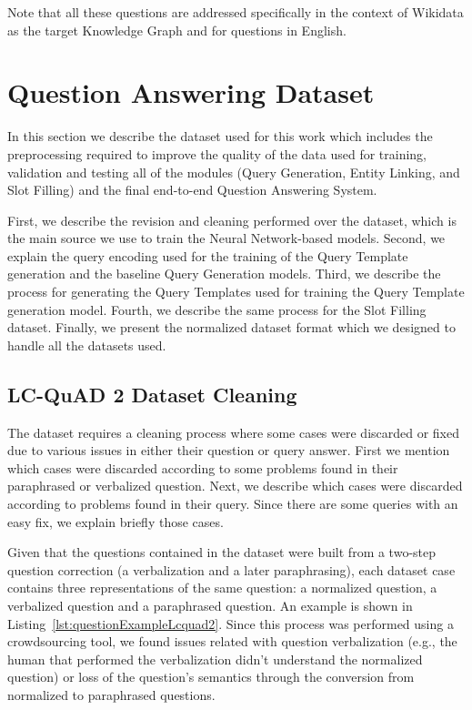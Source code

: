 Note that all these questions are addressed specifically in the context of Wikidata as 
the target Knowledge Graph and for questions in English.

\section{Question Answering Dataset}
\label{cap4:experimentalDesign/QaDataset}
In this section we describe the dataset used for this work which includes the preprocessing 
required to improve the quality of the data used for training, validation and testing all of 
the modules (Query Generation, Entity Linking, and Slot Filling) and the final end-to-end 
Question Answering System. 

First, we describe the revision and cleaning performed over the \LCQuADtwo{} dataset, which is the 
main source we use to train the Neural Network-based models. Second, we explain the \SPARQL{} query 
encoding used for the training of the Query Template generation and the baseline \SPARQL{} Query 
Generation models. Third, we describe the process for generating the Query Templates used for 
training the Query Template generation model. Fourth, we describe the same process for the Slot 
Filling dataset. Finally, we present the normalized dataset format which we designed to handle 
all the datasets used.

\subsection{LC-QuAD 2 Dataset Cleaning}
\label{cap4:experimentalDesign/QaDataset/cleaning}
The \LCQuADtwo{} dataset requires a cleaning process where some cases were discarded or fixed due 
to various issues in either their question or \SPARQL{} query answer. First we mention which cases 
were discarded according to some problems found in their paraphrased or verbalized question. 
Next, we describe which cases were discarded according to problems found in their \SPARQL{} query. 
Since there are some queries with an easy fix, we explain briefly those cases. 

Given that the questions contained in the \LCQuADtwo{} dataset were built from a two-step 
question correction (a verbalization and a later paraphrasing), each dataset case contains 
three representations of the same question: a normalized question, a verbalized question and a 
paraphrased question. An example is shown in Listing~\ref{lst:questionExampleLcquad2}. Since 
this process was performed using a crowdsourcing tool, we found issues related with question 
verbalization (e.g., the human that performed the verbalization didn’t understand the normalized 
question) or loss of the question’s semantics through the conversion from normalized to 
paraphrased questions.

